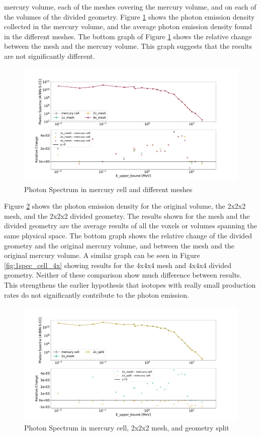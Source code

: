 mercury volume, each of the meshes covering the mercury volume, and on each of
the volumes of the divided geometry.
Figure \ref{fig:1spec_cell_1x_2x_4x} shows the photon emission density
collected in the mercury volume, and the average photon emission density
found in the different meshes. The bottom graph of Figure
\ref{fig:1spec_cell_1x_2x_4x} shows the relative change between the mesh and
the mercury volume. This graph suggests that the results are not significantly
different.
%
\begin{figure}[H]
 \centering
 \includegraphics[scale=0.4,trim={2cm 0.5cm 3cm 2cm},clip]{../figs/toy_p1/spec_VPI_1x_2x_4x.pdf}
 \caption{Photon Spectrum in mercury cell and different meshes}
 \label{fig:1spec_cell_1x_2x_4x}
\end{figure}
%
Figure \ref{fig:1spec_cell_2x} shows the photon emission density for the
original volume, the 2x2x2 mesh, and the 2x2x2 divided geometry. The results
shown for the mesh and the divided geometry are the average results of all the
voxels or volumes spanning the same physical space. The bottom graph shows the
relative change of the
divided geometry and the original mercury volume, and between the mesh and the
original mercury volume.
A similar graph can be seen in Figure \ref{fig:1spec_cell_4x} showing results
for the 4x4x4 mesh and 4x4x4 divided geometry.
Neither of these comparison show much difference between results. This
strengthens the earlier hypothesis that isotopes with really small production
rates do not significantly contribute to the photon emission.
%
\begin{figure}[H]
 \centering
 \includegraphics[scale=0.4,trim={2cm 0.5cm 3cm 2cm},clip]{../figs/toy_p1/spec_VPI_2x.pdf}
 \caption{Photon Spectrum in mercury cell, 2x2x2 mesh, and geometry split}
 \label{fig:1spec_cell_2x}
\end{figure}

